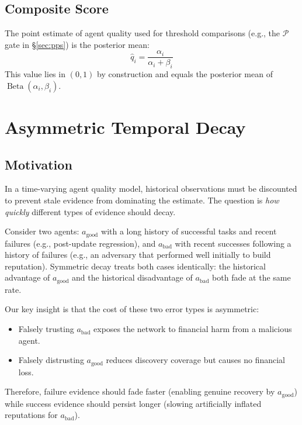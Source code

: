 \documentclass[conference]{IEEEtran}
\DeclareMathOperator{\Beta}{\mathrm{Beta}}
\begin{document}
\subsection{Composite Score}

The point estimate of agent quality used for threshold
comparisons (e.g., the $\mathcal{P}$ gate in \S\ref{sec:pps})
is the posterior mean:
\begin{equation}
  \hat{q}_i = \frac{\alpha_i}{\alpha_i + \beta_i}
  \label{eq:score}
\end{equation}
This value lies in $(0,1)$ by construction and equals the
posterior mean of $\Beta(\alpha_i, \beta_i)$.

\section{Asymmetric Temporal Decay}
\label{sec:decay}

\subsection{Motivation}

In a time-varying agent quality model, historical
observations must be discounted to prevent stale evidence
from dominating the estimate. The question is \emph{how
quickly} different types of evidence should decay.

Consider two agents: $a_{\text{good}}$ with a long history of
successful tasks and recent failures (e.g., post-update
regression), and $a_{\text{bad}}$ with recent successes
following a history of failures (e.g., an adversary that
performed well initially to build reputation). Symmetric decay
treats both cases identically: the historical advantage of
$a_{\text{good}}$ and the historical disadvantage of
$a_{\text{bad}}$ both fade at the same rate.

Our key insight is that the cost of these two error types is
asymmetric:
\begin{itemize}
  \item Falsely trusting $a_{\text{bad}}$ exposes the network
    to financial harm from a malicious agent.
  \item Falsely distrusting $a_{\text{good}}$ reduces
    discovery coverage but causes no financial loss.
\end{itemize}
Therefore, failure evidence should fade faster (enabling
genuine recovery by $a_{\text{good}}$) while success evidence
should persist longer (slowing artificially inflated
reputations for $a_{\text{bad}}$).
\end{document}
